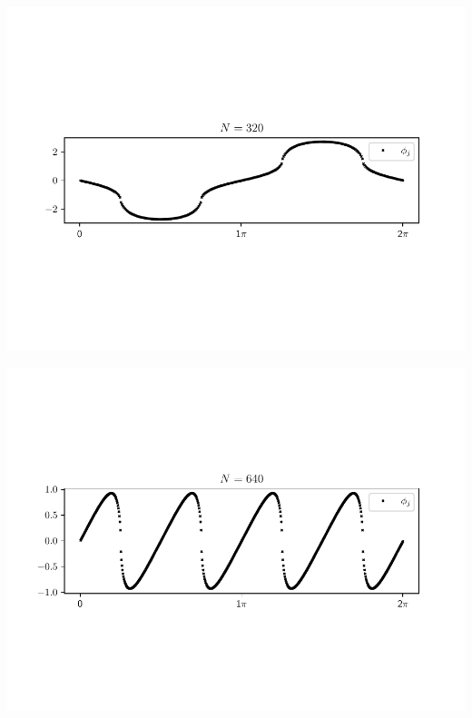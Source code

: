 \begin{Figure}
    \centering
    \captionsetup{type = figure}
    \includegraphics[width = \textwidth]{phi2_N320.pdf}
    \label{fig:phi2_square_N320}
\end{Figure}
\begin{Figure}
    \centering
    \captionsetup{type = figure}
    \includegraphics[width = \textwidth]{phi6_N640.pdf}
    \label{fig:phi1_square_N6400}
\end{Figure}